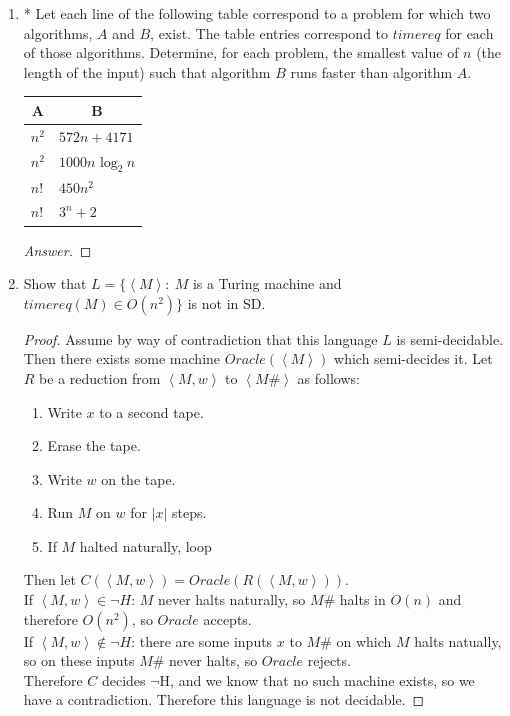 \documentclass[10pt]{article}
\newcommand{\card}[1]{\left| #1 \right|}
\newcommand{\brackets}[1]{\left< #1 \right>}
\begin{document}
\begin{enumerate}[1)]

\item
* Let each line of the following table correspond to a problem for which two algorithms, $A$ and $B$, exist.  The table entries correspond to $timereq$ for each of those algorithms.  Determine, for each problem, the smallest value of $n$ (the length of the input) such that algorithm $B$ runs faster than algorithm $A$.
\begin{center}
\begin{tabular}{| p{3cm} | p{3cm} |}
  \hline
  \multicolumn{1}{|c}{A}&
  \multicolumn{1}{|c|}{B}\\
  \hline
  $n^2$&$572n + 4171$\\
  \hline
  $n^2$&$1000n\textrm{ log}_2\ n$\\
  \hline
  $n!$&$450n^2$\\
  \hline
  $n!$&$3^n + 2$\\
  \hline
\end{tabular}
\end{center}
\begin{proof}[Answer]
\end{proof}

\pagebreak

\item
Show that $L = \{\brackets{M}:\ M$ is a Turing machine and $timereq(M) \in O(n^2)\}$ is not in SD.
\begin{proof}[Proof]
Assume by way of contradiction that this language $L$ is semi-decidable.  Then there exists some machine $Oracle(\brackets{M})$ which semi-decides it.  Let $R$ be a reduction from $\brackets{M, w}$ to $\brackets{M\#}$ as follows:
\begin{enumerate}[1.]
\item
Write $x$ to a second tape.
\item
Erase the tape.
\item
Write $w$ on the tape.
\item
Run $M$ on $w$ for $\card{x}$ steps.
\item
If $M$ halted naturally, loop
\end{enumerate}
Then let $C(\brackets{M, w}) = Oracle(R(\brackets{M, w}))$.\\
If $\brackets{M, w} \in \lnot H$: $M$ never halts naturally, so $M\#$ halts in $O(n)$ and therefore $O(n^2)$, so $Oracle$ accepts.\\
If $\brackets{M, w} \not \in \lnot H$: there are some inputs $x$ to $M\#$ on which $M$ halts natually, so on these inputs $M\#$ never halts, so $Oracle$ rejects.\\
Therefore $C$ decides $\lnot$H, and we know that no such machine exists, so we have a contradiction.  Therefore this language is not decidable.
\end{proof}


\end{enumerate}
\end{document}
